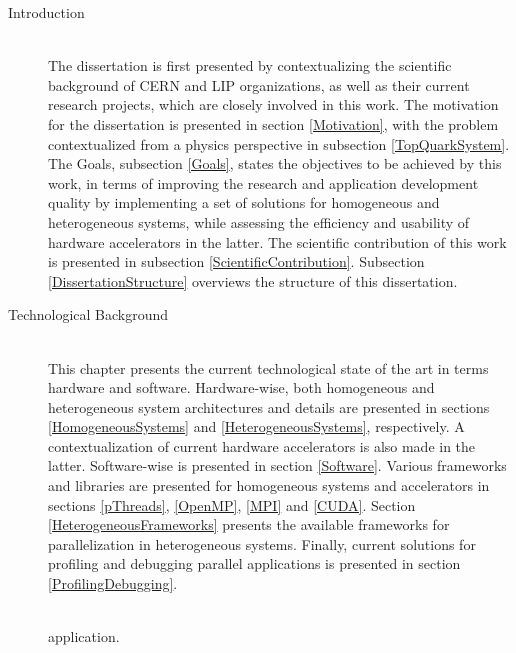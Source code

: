 \begin{description}
	\item[Introduction] \hfill \\
	The dissertation is first presented by contextualizing the scientific background of CERN and LIP organizations, as well as their current research projects, which are closely involved in this work. The motivation for the dissertation is presented in section \ref{Motivation}, with the problem contextualized from a physics perspective in subsection \ref{TopQuarkSystem}. The Goals, subsection \ref{Goals}, states the objectives to be achieved by this work, in terms of improving the research and application development quality by implementing a set of solutions for homogeneous and heterogeneous systems, while assessing the efficiency and usability of hardware accelerators in the latter. The scientific contribution of this work is presented in subsection \ref{ScientificContribution}. Subsection \ref{DissertationStructure} overviews the structure of this dissertation.
	\item[Technological Background] \hfill \\
	This chapter presents the current technological state of the art in terms hardware and software. Hardware-wise, both homogeneous and heterogeneous system architectures and details are presented in sections \ref{HomogeneousSystems} and \ref{HeterogeneousSystems}, respectively. A contextualization of current hardware accelerators is also made in the latter. Software-wise is presented in section \ref{Software}. Various frameworks and libraries are presented for homogeneous systems and accelerators in sections \ref{pThreads}, \ref{OpenMP}, \ref{MPI} and \ref{CUDA}. Section \ref{HeterogeneousFrameworks} presents the available frameworks for parallelization in heterogeneous systems. Finally, current solutions for profiling and debugging parallel applications is presented in section \ref{ProfilingDebugging}.
	\item[\tth] \hfill \\
	\tth application.
\end{description}
